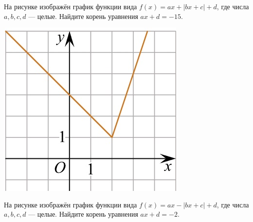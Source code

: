 %	
%
%
\begin{class}[number=6]
	\begin{listofex}
		\item
		\begin{minipage}[t]{0.7\textwidth}
			На рисунке изображён график функции вида \(f(x)=ax+|bx+c|+d\), где числа \(a, b, c, d\) --- целые. Найдите корень уравнения \(ax+d=-15\).
		\end{minipage}
		\begin{minipage}[c]{0.27\textwidth}
			\includegraphics[align=t, width=\textwidth]{pics/G101M4C5-7.jpg}
		\end{minipage}
		\item
		\begin{minipage}[t]{0.73\textwidth}
			На рисунке изображён график функции вида \(f(x)=ax-|bx+c|+d\), где числа \(a, b, c, d\) --- целые. Найдите корень уравнения \(ax+d=-2\).
		\end{minipage}
		\begin{minipage}[c]{0.23\textwidth}

\end{minipage}
\end{listofex}
\end{class}
